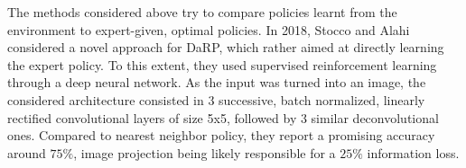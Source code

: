 \documentclass{article}
\begin{document}
The methods considered above try to compare policies learnt from the environment to expert-given, optimal policies.
In 2018, Stocco and Alahi considered a novel approach for DaRP,
which rather aimed at directly learning the expert policy.
To this extent, they used supervised reinforcement learning through a deep neural network.
As the input was turned into an image, %
the considered architecture consisted in 3 successive, batch normalized, linearly rectified convolutional layers of size 5x5,
followed by 3 similar deconvolutional ones.
Compared to nearest neighbor policy, they report a promising accuracy around $75 \%$,
image projection being likely responsible for a $25\%$ information loss.











\end{document}
